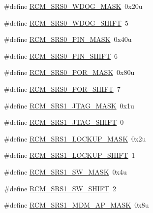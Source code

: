 \begin{DoxyCompactItemize}
\item 
\#define \hyperlink{group___r_c_m___register___masks_gad203634bcb298bf54a3d5cce5c378a7e}{R\+C\+M\+\_\+\+S\+R\+S0\+\_\+\+W\+D\+O\+G\+\_\+\+M\+A\+SK}~0x20u
\item 
\#define \hyperlink{group___r_c_m___register___masks_gac989a90d61cdfb7e612c212a3f6d06d8}{R\+C\+M\+\_\+\+S\+R\+S0\+\_\+\+W\+D\+O\+G\+\_\+\+S\+H\+I\+FT}~5
\item 
\#define \hyperlink{group___r_c_m___register___masks_gab94707d2e91618c8c803dfa2d8df4e7b}{R\+C\+M\+\_\+\+S\+R\+S0\+\_\+\+P\+I\+N\+\_\+\+M\+A\+SK}~0x40u
\item 
\#define \hyperlink{group___r_c_m___register___masks_ga1c1ae6946300c9f33bf5575d45d2b862}{R\+C\+M\+\_\+\+S\+R\+S0\+\_\+\+P\+I\+N\+\_\+\+S\+H\+I\+FT}~6
\item 
\#define \hyperlink{group___r_c_m___register___masks_gad172e7645b5b6a0c5a2ff91db3087f7e}{R\+C\+M\+\_\+\+S\+R\+S0\+\_\+\+P\+O\+R\+\_\+\+M\+A\+SK}~0x80u
\item 
\#define \hyperlink{group___r_c_m___register___masks_ga98b995f8d56d338b315d6750072474ff}{R\+C\+M\+\_\+\+S\+R\+S0\+\_\+\+P\+O\+R\+\_\+\+S\+H\+I\+FT}~7
\item 
\#define \hyperlink{group___r_c_m___register___masks_ga636e5479adb4c5dba899a740ca14af5f}{R\+C\+M\+\_\+\+S\+R\+S1\+\_\+\+J\+T\+A\+G\+\_\+\+M\+A\+SK}~0x1u
\item 
\#define \hyperlink{group___r_c_m___register___masks_ga1184957c2244e1d98aed4a802ca8534d}{R\+C\+M\+\_\+\+S\+R\+S1\+\_\+\+J\+T\+A\+G\+\_\+\+S\+H\+I\+FT}~0
\item 
\#define \hyperlink{group___r_c_m___register___masks_ga4f7c4ce64c13c55fc0c7aaea3a702a03}{R\+C\+M\+\_\+\+S\+R\+S1\+\_\+\+L\+O\+C\+K\+U\+P\+\_\+\+M\+A\+SK}~0x2u
\item 
\#define \hyperlink{group___r_c_m___register___masks_ga71f857503a2b2d2e0c30d4762e89a8d8}{R\+C\+M\+\_\+\+S\+R\+S1\+\_\+\+L\+O\+C\+K\+U\+P\+\_\+\+S\+H\+I\+FT}~1
\item 
\#define \hyperlink{group___r_c_m___register___masks_ga72f541acd2a0992ad0d1d089c694ad5f}{R\+C\+M\+\_\+\+S\+R\+S1\+\_\+\+S\+W\+\_\+\+M\+A\+SK}~0x4u
\item 
\#define \hyperlink{group___r_c_m___register___masks_ga7e554c1ae96dae684fbc81204283f86c}{R\+C\+M\+\_\+\+S\+R\+S1\+\_\+\+S\+W\+\_\+\+S\+H\+I\+FT}~2
\item 
\#define \hyperlink{group___r_c_m___register___masks_ga6af4d8ed2135b602de575373f22b1af8}{R\+C\+M\+\_\+\+S\+R\+S1\+\_\+\+M\+D\+M\+\_\+\+A\+P\+\_\+\+M\+A\+SK}~0x8u

\end{DoxyCompactItemize}
